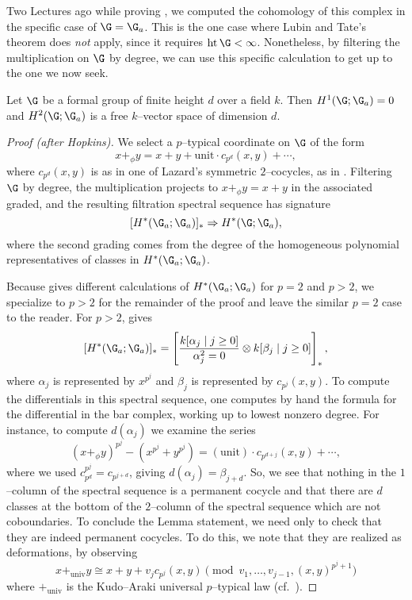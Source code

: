 Two Lectures ago while proving , we computed the cohomology of this complex in the specific case of \(\G = \G_a\).  This is the one case where Lubin and Tate's theorem does \emph{not} apply, since it requires \(\height \G < \infty\).  Nonetheless, by filtering the multiplication on \(\G\) by degree, we can use this specific calculation to get up to the one we now seek.

\begin{lemma}\label{CalculationOfLTTangentSpace}
Let \(\G\) be a formal group of finite height \(d\) over a field \(k\).  Then \(H^1(\G; \G_a) = 0\) and \(H^2(\G; \G_a)\) is a free \(k\)--vector space of dimension \(d\).
\end{lemma}
\begin{proof}[Proof (after Hopkins)]
We select a \(p\)--typical coordinate on \(\G\) of the form \[x +_\phi y = x + y + \mathrm{unit} \cdot c_{p^d}(x, y) + \cdots,\] where \(c_{p^d}(x, y)\) is as in one of Lazard's symmetric \(2\)--cocycles, as in .  Filtering \(\G\) by degree, the multiplication projects to \(x +_\phi y = x + y\) in the associated graded, and the resulting filtration spectral sequence has signature \[[H^*(\G_a; \G_a)]_* \Rightarrow H^*(\G; \G_a),\] where the second grading comes from the degree of the homogeneous polynomial representatives of classes in \(H^*(\G_a; \G_a)\).

Because  gives different calculations of \(H^*(\G_a; \G_a)\) for \(p = 2\) and \(p > 2\), we specialize to \(p > 2\) for the remainder of the proof and leave the similar \(p = 2\) case to the reader.  For \(p > 2\),  gives \[[H^*(\G_a; \G_a)]_* = \left[\frac{k[\alpha_j \mid j \ge 0]}{\alpha_j^2 = 0} \otimes k[\beta_j \mid j \ge 0]\right]_*,\] where \(\alpha_j\) is represented by \(x^{p^j}\) and \(\beta_j\) is represented by \(c_{p^j}(x, y)\).  To compute the differentials in this spectral sequence, one computes by hand the formula for the differential in the bar complex, working up to lowest nonzero degree.  For instance, to compute \(d(\alpha_j)\) we examine the series \[(x +_\phi y)^{p^j} - (x^{p^j} + y^{p^j}) = (\text{unit}) \cdot c_{p^{d + j}}(x, y) + \cdots,\] where we used \(c_{p^d}^{p^j} = c_{p^{j+d}}\), giving \(d(\alpha_j) = \beta_{j+d}\).  So, we see that nothing in the \(1\)--column of the spectral sequence is a permanent cocycle and that there are \(d\) classes at the bottom of the \(2\)--column of the spectral sequence which are not coboundaries.  To conclude the Lemma statement, we need only to check that they are indeed permanent cocycles.  To do this, we note that they are realized as deformations, by observing \[x +_{\mathrm{univ}} y \cong x + y + v_j c_{p^j}(x, y) \pmod{v_1, \ldots, v_{j-1}, (x, y)^{p^j+1}}\] where \(+_{\mathrm{univ}}\) is the Kudo--Araki universal \(p\)--typical law (cf.\ \cite[Proposition 1.1]{LubinTate}).
\end{proof}


